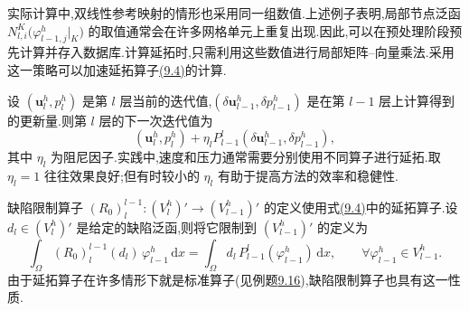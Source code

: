 \begin{example}[(局部泛函的计算)]
\begin{itemize}
实际计算中,双线性参考映射的情形也采用同一组数值.上述例子表明,局部节点泛函 $N_{l,i}^K\bigl(\varphi_{l-1,j}^h|_K\bigr)$ 的取值通常会在许多网格单元上重复出现.因此,可以在预处理阶段预先计算并存入数据库.计算延拓时,只需利用这些数值进行局部矩阵--向量乘法.采用这一策略可以加速延拓算子\hyperref[eq:chapter9-function-prolongation]{(9.4)}的计算.
\end{itemize}
\end{example}



\begin{note}[延拓后的更新]
\label{note:chapter9-update-after-prolongation}
设 $(\bm u_l^h,p_l^h)$ 是第 $l$ 层当前的迭代值,$(\delta\bm u_{l-1}^h,\delta p_{l-1}^h)$ 是在第 $l-1$ 层上计算得到的更新量.则第 $l$ 层的下一次迭代值为
\[
 (\bm u_l^h,p_l^h)+
 \eta_l P_{l-1}^{l}(\delta\bm u_{l-1}^h,\delta p_{l-1}^h),
\]
其中 $\eta_l$ 为阻尼因子.实践中,速度和压力通常需要分别使用不同算子进行延拓.取 $\eta_l=1$ 往往效果良好;但有时较小的 $\eta_l$ 有助于提高方法的效率和稳健性.
\end{note}

\begin{note}[缺陷限制]
\label{note:chapter9-defect-restriction}
缺陷限制算子 $(R_0)_l^{l-1}:(V_l^h)'\to(V_{l-1}^h)'$ 的定义使用式\hyperref[eq:chapter9-function-prolongation]{(9.4)}中的延拓算子.设 $d_l\in(V_l^h)'$ 是给定的缺陷泛函,则将它限制到 $(V_{l-1}^h)'$ 的定义为
\[
 \int_\Omega (R_0)_l^{l-1}(d_l)\,\varphi_{l-1}^h\,\mathrm dx
 =\int_\Omega d_l\,P_{l-1}^{l}(\varphi_{l-1}^h)\,\mathrm dx,
 \qquad \forall\varphi_{l-1}^h\in V_{l-1}^h.
\]
由于延拓算子在许多情形下就是标准算子(见例题\hyperref[ex:chapter9-local-functional-evaluation]{9.16}),缺陷限制算子也具有这一性质.
\end{note}

